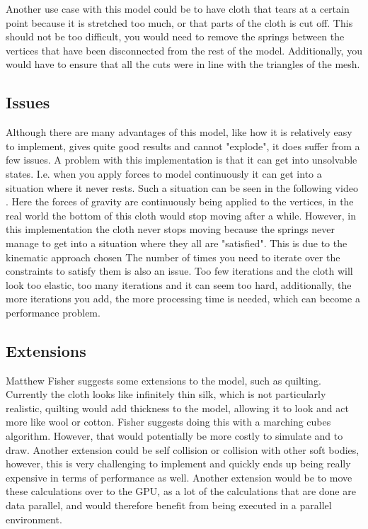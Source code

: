 Another use case with this model could be to have cloth that tears at a certain point because it is stretched too much,
or that parts of the cloth is cut off. This should not be too difficult, you would need to remove the springs between
the vertices that have been disconnected from the rest of the model.
Additionally, you would have to ensure that all the cuts were in line with the triangles of the mesh.

\subsection{Issues}
Although there are many advantages of this model, like how it is relatively easy to implement, gives quite good results and cannot "explode", it does suffer from a few issues.
A problem with this implementation is that it can get into unsolvable states.
I.e. when you apply forces to model continuously it can get into a situation where it never rests.
Such a situation can be seen in the following video .
Here the forces of gravity are continuously being applied to the vertices, in the real world the bottom
of this cloth would stop moving after a while. However, in this implementation the cloth never stops moving
because the springs never manage to get into a situation where they all are "satisfied".
This is due to the kinematic approach chosen\cite{math_for_games}
The number of times you need to iterate over the constraints to satisfy them is also an issue.
Too few iterations and the cloth will look too elastic, too many iterations and it can seem too hard,
additionally, the more iterations you add, the more processing time is needed, which can become a performance problem.

\subsection{Extensions}
Matthew Fisher\cite{matthew_fisher} suggests some extensions to the model,
such as quilting. Currently the cloth looks like infinitely thin silk, which is not particularly realistic,
quilting would add thickness to the model, allowing it to look and act more like wool or cotton. 
Fisher suggests doing this with a marching cubes algorithm.
However, that would potentially be more costly to simulate and to draw.
Another extension could be self collision or collision with other soft bodies, however, this is very challenging to implement
and quickly ends up being really expensive in terms of performance as well.
Another extension would be to move these calculations over to the GPU, as a lot of the calculations that are done are data parallel,
and would therefore benefit from being executed in a parallel environment.




